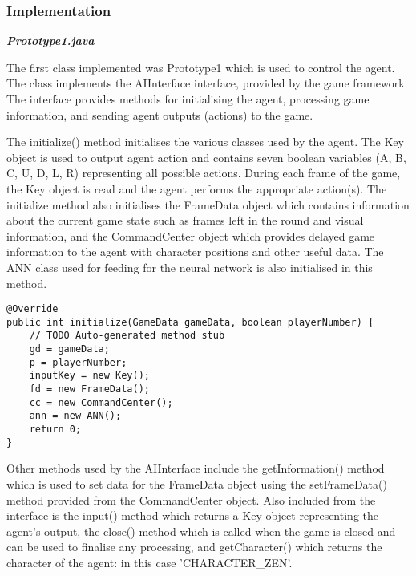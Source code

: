 \documentclass[12pt,a4paper]{article}
\begin{document}
\subsubsection{Implementation}

\textbf{\textit{Prototype1.java}}

\vspace{3mm}

The first class implemented was Prototype1 which is used to control the agent. The class implements the AIInterface interface, provided by the game framework. The interface provides methods for initialising the agent, processing game information, and sending agent outputs (actions) to the game. 

The initialize() method initialises the various classes used by the agent. The Key object is used to output agent action and contains seven boolean variables (A, B, C, U, D, L, R) representing all possible actions. During each frame of the game, the Key object is read and the agent performs the appropriate action(s). The initialize method also initialises the FrameData object which contains information about the current game state such as frames left in the round and visual information, and the CommandCenter object which provides delayed game information to the agent with character positions and other useful data. The ANN class used for feeding for the neural network is also initialised in this method.

\vspace{5mm}

\begin{lstlisting}
@Override
public int initialize(GameData gameData, boolean playerNumber) {
	// TODO Auto-generated method stub
	gd = gameData;
	p = playerNumber;
	inputKey = new Key();
	fd = new FrameData();
	cc = new CommandCenter();
	ann = new ANN();
	return 0;
}
\end{lstlisting}

\newpage
Other methods used by the AIInterface include the getInformation() method which is used to set data for the FrameData object using the setFrameData() method provided from the CommandCenter object. Also included from the interface is the input() method which returns a Key object representing the agent's output, the close() method which is called when the game is closed and can be used to finalise any processing, and getCharacter() which returns the character of the agent: in this case 'CHARACTER\_ZEN'.
\end{document}
